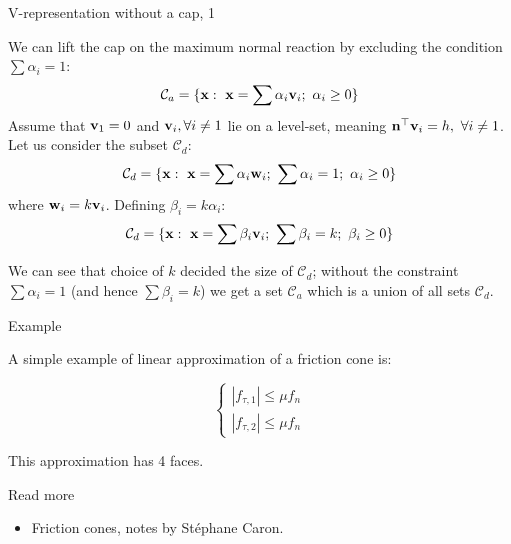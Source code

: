 \documentclass{beamer}
\begin{document}
\begin{frame}{V-representation without a cap, 1}
	\begin{flushleft}
		
		We can lift the cap on the maximum normal reaction by excluding the condition $\sum \alpha_i = 1$:
		\begin{align}
			\mathcal{C}_a = \{ \mathbf{x}: \ \mathbf{x} = \sum \alpha_i \mathbf{v}_i; \ \alpha_i \geq 0\}
		\end{align}
		Assume that $\mathbf{v}_1 = 0$ and $\mathbf{v}_i, \forall i \neq 1$ lie on a level-set, meaning $\mathbf{n}^\top\mathbf{v}_i = h, \ \forall i \neq 1$. Let us consider the subset $\mathcal{C}_d$:
		\begin{align}
			\mathcal{C}_d = \{ \mathbf{x}: \ \mathbf{x} = \sum \alpha_i \mathbf{w}_i; \  \sum \alpha_i = 1;  \ \alpha_i \geq 0\}
		\end{align}
		where $\mathbf{w}_i = k \mathbf{v}_i$. Defining $\beta_i = k \alpha_i$:
		\begin{align}
			\mathcal{C}_d = \{ \mathbf{x}: \ \mathbf{x} = \sum \beta_i \mathbf{v}_i; \  \sum \beta_i = k;  \ \beta_i \geq 0\}
		\end{align}
	
		We can see that choice of $k$ decided the size of $\mathcal{C}_d$; without the constraint $\sum \alpha_i = 1$ (and hence $\sum \beta_i = k$) we get a set $\mathcal{C}_a$ which is a union of all sets $\mathcal{C}_d$.
		
	\end{flushleft}
\end{frame}




\begin{frame}{Example}
	\begin{flushleft}
		
		A simple example of linear approximation of a friction cone is:
		
		\begin{equation}
			\begin{cases}
				|f_{\tau, 1}| \leq \mu f_n \\
				|f_{\tau, 2}| \leq \mu f_n
			\end{cases}
		\end{equation}
		
		This approximation has 4 faces.
		
	\end{flushleft}
\end{frame}



\begin{frame}{Read more}
	\begin{itemize}
		\item Friction cones, notes by St\'ephane Caron. 
		 
	\end{itemize}
\end{frame}



\myqrframe
\end{document}
